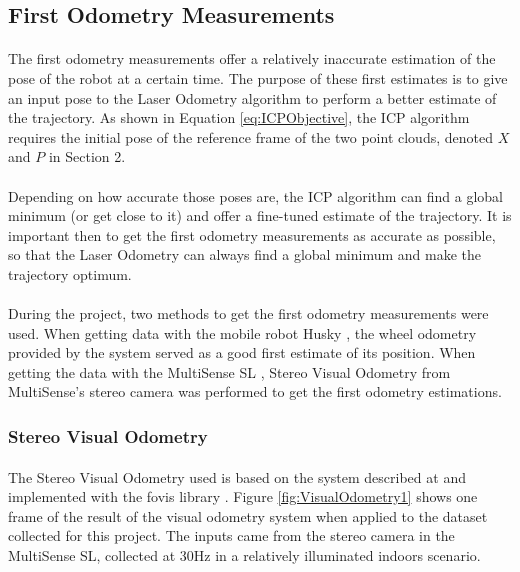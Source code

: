 \documentclass[12pt]{article}
\begin{document}
	\subsection{First Odometry Measurements}
	\paragraph{}
	The first odometry measurements offer a relatively inaccurate estimation of the pose of the robot at a certain time. The purpose of these first estimates is to give an input pose to the Laser Odometry algorithm to perform a better estimate of the trajectory. As shown in Equation \ref{eq:ICPObjective}, the ICP algorithm requires the initial pose of the reference frame of the two point clouds, denoted $X$ and $P$ in Section 2.

	\paragraph{}	
	Depending on how accurate those poses are, the ICP algorithm can find a global minimum (or get close to it) and offer a fine-tuned estimate of the trajectory. It is important then to get the first odometry measurements as accurate as possible, so that the Laser Odometry can always find a global minimum and make the trajectory optimum.
	
	\paragraph{}
	During the project, two methods to get the first odometry measurements were used. When getting data with the mobile robot Husky \cite{Husky}, the wheel odometry provided by the system served as a good first estimate of its position. When getting the data with the MultiSense SL \cite{multisense}, Stereo Visual Odometry from MultiSense's stereo camera was performed to get the first odometry estimations.
	
	\subsubsection*{Stereo Visual Odometry}
	\paragraph{}
	The Stereo Visual Odometry used is based on the system described at \cite{VisualOdometry} and implemented with the fovis library \cite{fovis}. Figure \ref{fig:VisualOdometry1} shows one frame of the result of the visual odometry system when applied to the dataset collected for this project. The inputs came from the stereo camera in the MultiSense SL, collected at 30Hz in a relatively illuminated indoors scenario.
	
\end{document}
